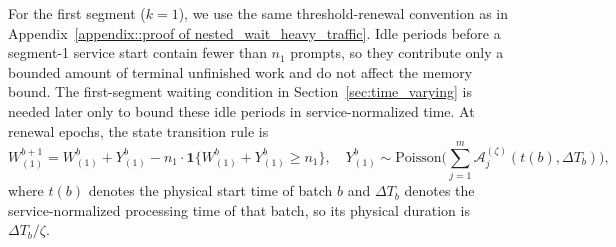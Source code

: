 For the first segment ($k=1$), we use the same threshold-renewal convention as in Appendix~\ref{appendix::proof of nested_wait_heavy_traffic}. Idle periods before a segment-1 service start contain fewer than \(n_1\) prompts, so they contribute only a bounded amount of terminal unfinished work and do not affect the memory bound. The first-segment waiting condition in Section~\ref{sec:time_varying} is needed later only to bound these idle periods in service-normalized time. At renewal epochs, the state transition rule is
$$ W_{(1)}^{b+1} = W_{(1)}^{b} + Y_{(1)}^b  - n_1 \cdot \mathbf{1}\{ W_{(1)}^{b} + Y_{(1)}^b \geq n_1 \},  \quad Y_{(1)}^b \sim \text{Poisson}\Big( \sum_{j=1}^m \mathcal A_j^{(\zeta)}(t(b),\Delta T_b) \Big),  $$
where $t(b)$ denotes the physical start time of batch $b$ and $\Delta T_b$ denotes the service-normalized processing time of that batch, so its physical duration is \(\Delta T_b/\zeta\).

